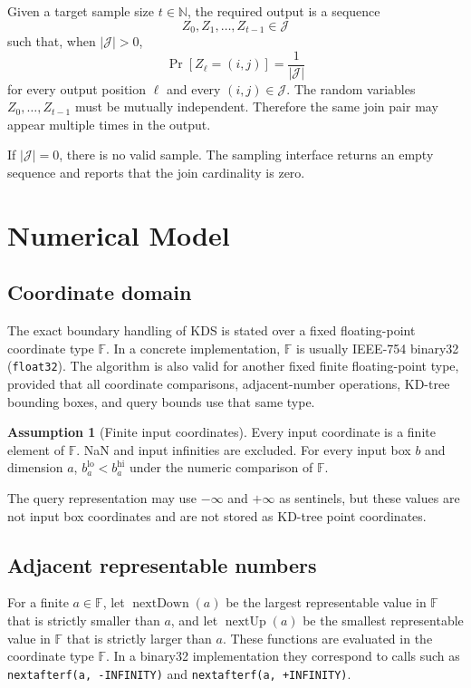 \documentclass[11pt]{article}
\theoremstyle{definition}
\newtheorem{assumption}{Assumption}[section]
\theoremstyle{plain}
\theoremstyle{remark}
\DeclareMathOperator{\nextUp}{nextUp}
\DeclareMathOperator{\nextDown}{nextDown}
\newcommand{\Jset}{\mathcal J}
\newcommand{\F}{\mathbb F}
\newcommand{\lo}{\mathrm{lo}}
\newcommand{\hi}{\mathrm{hi}}
\newcommand{\Nat}{\mathbb N}
\begin{document}
Given a target sample size $t\in\Nat$, the required output is a sequence
\[
  Z_0,Z_1,\ldots,Z_{t-1}\in\Jset
\]
such that, when $|\Jset|>0$,
\[
  \Pr[Z_\ell=(i,j)] = \frac{1}{|\Jset|}
\]
for every output position $\ell$ and every $(i,j)\in\Jset$.  The random variables
$Z_0,\ldots,Z_{t-1}$ must be mutually independent.  Therefore the same join pair may appear
multiple times in the output.

If $|\Jset|=0$, there is no valid sample.  The sampling interface returns an empty sequence
and reports that the join cardinality is zero.

\section{Numerical Model}

\subsection{Coordinate domain}

The exact boundary handling of KDS is stated over a fixed floating-point coordinate type
$\F$.  In a concrete implementation, $\F$ is usually IEEE-754 binary32
(\texttt{float32}).  The algorithm is also valid for another fixed finite floating-point
type, provided that all coordinate comparisons, adjacent-number operations, KD-tree bounding
boxes, and query bounds use that same type.

\begin{assumption}[Finite input coordinates]
Every input coordinate is a finite element of $\F$.  NaN and input infinities are excluded.
For every input box $b$ and dimension $a$, $b^{\lo}_a<b^{\hi}_a$ under the numeric comparison
of $\F$.
\end{assumption}

The query representation may use $-\infty$ and $+\infty$ as sentinels, but these values are
not input box coordinates and are not stored as KD-tree point coordinates.

\subsection{Adjacent representable numbers}

For a finite $a\in\F$, let $\nextDown(a)$ be the largest representable value in $\F$ that is
strictly smaller than $a$, and let $\nextUp(a)$ be the smallest representable value in $\F$
that is strictly larger than $a$.  These functions are evaluated in the coordinate type
$\F$.  In a binary32 implementation they correspond to calls such as
\texttt{nextafterf(a, -INFINITY)} and \texttt{nextafterf(a, +INFINITY)}.
\end{document}
